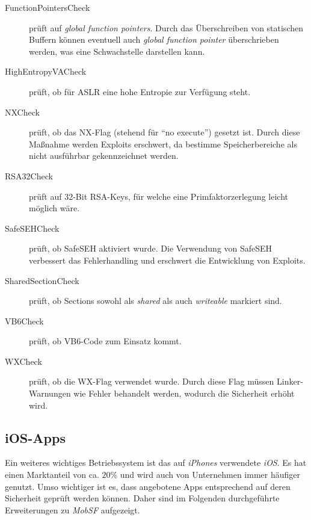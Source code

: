 \begin{description}
	\item[FunctionPointersCheck] prüft auf \textit{global function pointers}. Durch das Überschreiben von statischen Buffern können eventuell auch \textit{global function pointer} überschrieben werden, was eine Schwachstelle darstellen kann.

	\item[HighEntropyVACheck] prüft, ob für ASLR eine hohe Entropie zur Verfügung steht.
	
	\item[NXCheck] prüft, ob das NX-Flag (stehend für "`no execute"') gesetzt ist. Durch diese Maßnahme werden Exploits erschwert, da bestimme Speicherbereiche als nicht ausführbar gekennzeichnet werden.
	
	\item[RSA32Check] prüft auf 32-Bit RSA-Keys, für welche eine Primfaktorzerlegung leicht möglich wäre.
	
	\item[SafeSEHCheck] prüft, ob SafeSEH aktiviert wurde. Die Verwendung von SafeSEH verbessert das Fehlerhandling und erschwert die Entwicklung von Exploits.
	
	\item[SharedSectionCheck] prüft, ob Sections sowohl als \textit{shared} als auch \textit{writeable} markiert sind.
	
	\item[VB6Check] prüft, ob VB6-Code zum Einsatz kommt.
	
	\item[WXCheck] prüft, ob die WX-Flag verwendet wurde. Durch diese Flag müssen Linker-Warnungen wie Fehler behandelt werden, wodurch die Sicherheit erhöht wird.
\end{description}

\newpage
\subsection{iOS-Apps}
Ein weiteres wichtiges Betriebssystem ist das auf \textit{iPhones} verwendete \textit{iOS}.  Es hat einen Marktanteil von ca. $20\%$\cite{KatarWorldpanelMobBetrSys} und wird auch von Unternehmen immer häufiger genutzt. Umso wichtiger ist es, dass angebotene Apps entsprechend auf deren Sicherheit geprüft werden können. Daher sind im Folgenden durchgeführte Erweiterungen zu \textit{MobSF} aufgezeigt.

